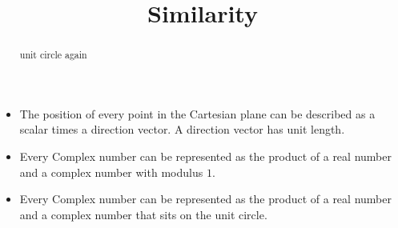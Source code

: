 \documentclass{ximera}
\title{Similarity}
\begin{document}
\begin{abstract}
unit circle again
\end{abstract}
\maketitle



\begin{itemize}
\item The position of every point in the Cartesian plane can be described as a scalar times a direction vector.  A direction vector has unit length.

\item Every Complex number can be represented as the product of a real number and a complex number with modulus $1$.


\item Every Complex number can be represented as the product of a real number and a complex number that sits on the unit circle.
\end{itemize}
\end{document}
